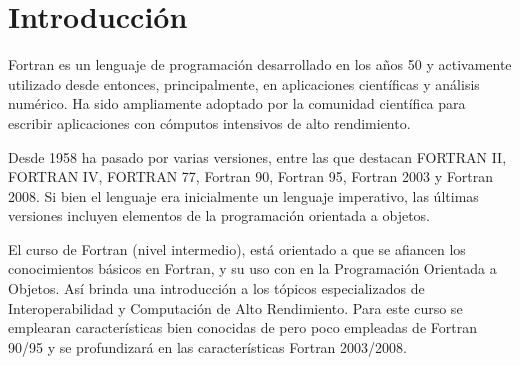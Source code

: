 \section{Introducción}


Fortran es un lenguaje de programación desarrollado en los años 50 y activamente utilizado desde entonces, principalmente, en aplicaciones científicas y análisis numérico. Ha sido ampliamente adoptado por la comunidad científica para escribir aplicaciones con cómputos intensivos de alto rendimiento.

Desde 1958 ha pasado por varias versiones, entre las que destacan FORTRAN II, FORTRAN IV, FORTRAN 77, Fortran 90, Fortran 95, Fortran 2003 y Fortran 2008. Si bien el lenguaje era inicialmente un lenguaje imperativo, las últimas versiones incluyen elementos de la programación orientada a objetos.

El curso de Fortran (nivel intermedio), está orientado a que se afiancen los conocimientos básicos en Fortran, y su uso con en la Programación Orientada a Objetos. Así brinda una introducción a los tópicos especializados de Interoperabilidad y Computación de Alto Rendimiento. Para este curso se emplearan características bien conocidas de pero poco empleadas de Fortran 90/95 y se profundizará en las características Fortran 2003/2008.
